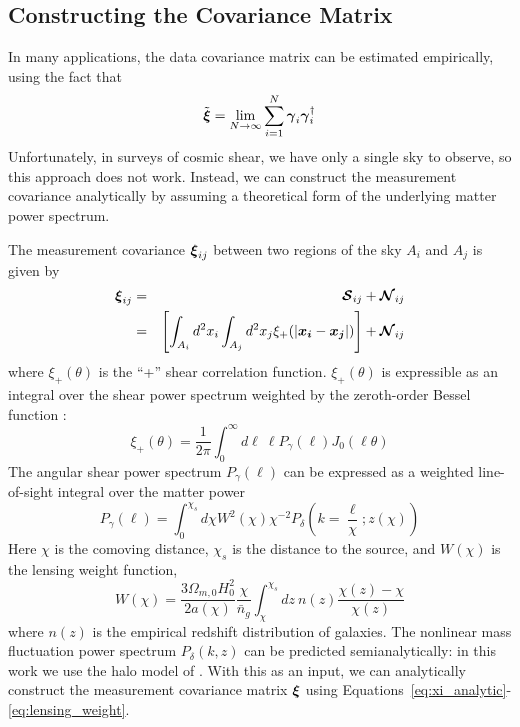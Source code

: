 \subsection{Constructing the Covariance Matrix}
In many applications, the data covariance matrix can be estimated
empirically, using the fact that
\begin{equation}
  \tilde{\boldsymbol{\xi}} = \lim_{N\to\infty} \sum_{i=1}^N 
  \boldsymbol{\gamma}_i \boldsymbol{\gamma}_i^\dagger
\end{equation}
Unfortunately, in surveys of cosmic shear, we have only a single sky to
observe, so this approach does not work.  Instead, we can construct the
measurement covariance analytically by assuming a theoretical form of the
underlying matter power spectrum.

The measurement covariance $\boldsymbol{\xi}_{ij}$ between two regions of the
sky $A_i$ and $A_j$ is given by
\begin{eqnarray}
  \label{eq:xi_analytic}
  \boldsymbol{\xi}_{ij} 
  &=& \boldsymbol{\mathcal{S}}_{ij} + \boldsymbol{\mathcal{N}}_{ij} \nonumber\\
  &=& \left[\int_{A_i}d^2x_i\int_{A_j}d^2x_j 
    \xi_+(|\boldsymbol{x_i}-\boldsymbol{x_j}|)\right]
  + \boldsymbol{\mathcal{N}}_{ij}
\end{eqnarray}
where $\xi_+(\theta)$ is the ``+'' shear correlation function. 
$\xi_+(\theta)$ is expressible as an integral over the shear power spectrum
weighted by the zeroth-order Bessel function
\citep[see, e.g.][]{Schneider02}:
\begin{equation}
  \label{eq:xi_plus_def}
  \xi_+(\theta) 
  = \frac{1}{2\pi} \int_0^\infty d\ell\ \ell P_\gamma(\ell) J_0(\ell\theta)
\end{equation}
The angular shear power spectrum $P_\gamma(\ell)$ can be expressed as a
weighted line-of-sight integral over the matter power
\begin{equation}
  P_\gamma(\ell) = \int_0^{\chi_s}d\chi W^2(\chi)\chi^{-2}
  P_\delta\left(k=\frac{\ell}{\chi};z(\chi)\right)
\end{equation}
Here $\chi$ is the comoving distance, $\chi_s$ is the distance to the
source, and $W(\chi)$ is the lensing weight function,
\begin{equation}
  \label{eq:lensing_weight}
  W(\chi) = \frac{3\Omega_{m,0}H_0^2}{2a(\chi)}\frac{\chi}{\bar{n}_g}
  \int_{\chi}^{\chi_s}dz\ n(z) \frac{\chi(z)-\chi}{\chi(z)}
\end{equation}
where $n(z)$ is the empirical redshift distribution of galaxies.
The nonlinear mass fluctuation power spectrum $P_\delta(k, z)$ can be
predicted semianalytically: in this work we use the halo model of
\citet{Smith03}.  With this as an input, we can analytically
construct the measurement covariance matrix $\boldsymbol{\xi}$ using 
Equations~\ref{eq:xi_analytic}-\ref{eq:lensing_weight}.

